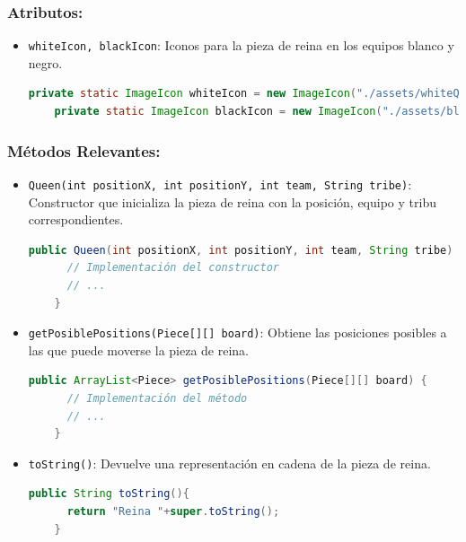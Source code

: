 \documentclass{article}
\begin{document}
\subsubsection{Atributos:}
\begin{itemize}
  \item \texttt{whiteIcon, blackIcon}: Iconos para la pieza de reina en los equipos blanco y negro.
  \begin{lstlisting}[language=java,caption={Atributos \texttt{whiteIcon} y \texttt{blackIcon} en la clase \texttt{Queen}}]
    private static ImageIcon whiteIcon = new ImageIcon("./assets/whiteQueen.png");
    private static ImageIcon blackIcon = new ImageIcon("./assets/blackQueen.png");
  \end{lstlisting}
\end{itemize}

\subsubsection{Métodos Relevantes:}
\begin{itemize}
  \item \texttt{Queen(int positionX, int positionY, int team, String tribe)}: Constructor que inicializa la pieza de reina con la posición, equipo y tribu correspondientes.
  \begin{lstlisting}[language=java,caption={Constructor \texttt{Queen} en la clase \texttt{Queen}}]
    public Queen(int positionX, int positionY, int team, String tribe) {
      // Implementación del constructor
      // ...
    }
  \end{lstlisting}

  \item \texttt{getPosiblePositions(Piece[][] board)}: Obtiene las posiciones posibles a las que puede moverse la pieza de reina.
  \begin{lstlisting}[language=java,caption={Método \texttt{getPosiblePositions} en la clase \texttt{Queen}}]
    public ArrayList<Piece> getPosiblePositions(Piece[][] board) {
      // Implementación del método
      // ...
    }
  \end{lstlisting}

  \item \texttt{toString()}: Devuelve una representación en cadena de la pieza de reina.
  \begin{lstlisting}[language=java,caption={Método \texttt{toString} en la clase \texttt{Queen}}]
    public String toString(){
      return "Reina "+super.toString();
    }
  \end{lstlisting}
\end{itemize}
\end{document}
